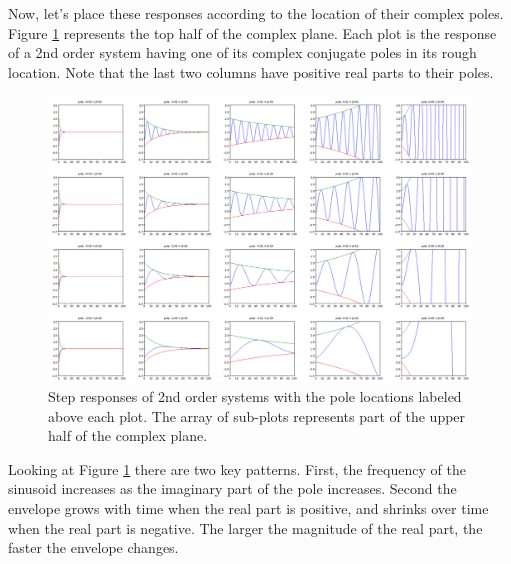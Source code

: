 Now, let's place these responses according to the location of their complex poles.  Figure \ref{splaneresponse} represents the top half of the complex plane.   Each plot is the response of a 2nd order system having one of its complex conjugate poles in its rough location.  Note that the last two columns have positive real parts to their poles.



\begin{figure}\centering
  \includegraphics[width=6.5in]{figs05/s_plane_responsesa.png}
  \caption{Step responses of 2nd order systems with the pole locations labeled above each plot. The array of sub-plots represents part of the upper half of the complex plane.}\label{splaneresponse}
\end{figure}


Looking at Figure \ref{splaneresponse} there are two key patterns.  First, the frequency of the sinusoid increases as the imaginary part of the pole increases.  Second the envelope grows with time when the real part is positive, and shrinks over time when the real part is negative.   The larger the magnitude of the real part, the faster the envelope changes.



